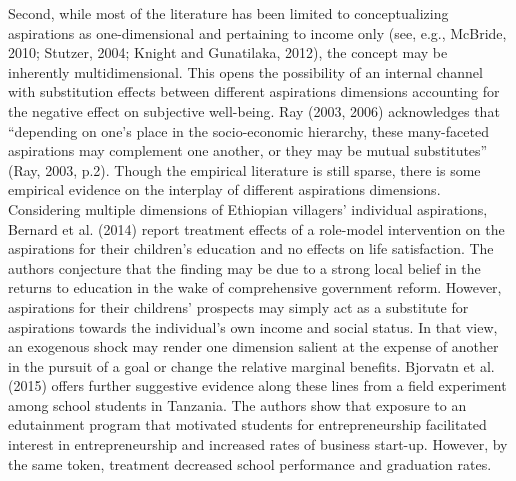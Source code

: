 \documentclass[11.5pt]{article}
\begin{document}
Second, while most of the literature has been limited to conceptualizing aspirations as one-dimensional and pertaining to income only (see, e.g., McBride, 2010; Stutzer, 2004; Knight and Gunatilaka, 2012), the concept may be inherently multidimensional. This opens the possibility of an internal channel with substitution effects between different aspirations dimensions accounting for the negative effect on subjective well-being. Ray (2003, 2006) acknowledges that ``depending on one's place in the socio-economic hierarchy, these many-faceted aspirations may complement one another, or they may be mutual substitutes'' (Ray, 2003, p.2). Though the empirical literature is still sparse, there is some empirical evidence on the interplay of different aspirations dimensions. Considering multiple dimensions of Ethiopian villagers' individual aspirations, Bernard et al. (2014) report treatment effects of a role-model intervention on the aspirations for their children's education and no effects on life satisfaction. The authors conjecture that the finding may be due to a strong local belief in the returns to education in the wake of comprehensive government reform. However, aspirations for their childrens' prospects may simply act as a substitute for aspirations towards the individual's own income and social status. In that view, an exogenous shock may render one dimension salient at the expense of another in the pursuit of a goal or change the relative marginal benefits. Bjorvatn et al. (2015) offers further suggestive evidence along these lines from a field experiment among school students in Tanzania. The authors show that exposure to an edutainment program that motivated students for entrepreneurship facilitated interest in entrepreneurship and increased rates of business start-up. However, by the same token, treatment decreased school performance and graduation rates.
\end{document}
